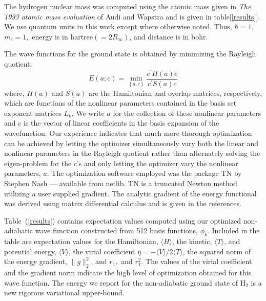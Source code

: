 \documentclass[12pt]{article}
\begin{document}
The hydrogen nuclear mass was computed
using the atomic mass given in \emph{The 1993 atomic mass evaluation} of
Audi and Wapstra\cite{Audi93} and is given in table[\ref{results}].
We use quantum units in this work except where
otherwise noted. Thus, $\hbar =1,$ $m_e=1,$ energy is in hartree$\left(
=2R_\infty \right) $, and distance is in bohr. 

The wave functions for the ground state is obtained by minimizing
the Rayleigh quotient; 
\begin{equation}
E\left( a;c\right) =\min_{\left\{ a,c\right\} }\frac{c^{\prime }H(a)c}{
c^{\prime }S(a)c}  \label{energy}
\end{equation}
where,
$H\left( a\right) $ and $S\left( a\right) $ are the Hamiltonian and overlap
matrices, respectively, 
which are functions of the nonlinear parameters contained in the
basis set exponent matrices $L_k$. We write $a$ for the collection of these
nonlinear parameters and $c$ is the vector of linear coefficients in the basis
expansion of the wavefunction.
Our experience indicates that 
much more thorough optimization can be achieved
by letting the optimizer
simultaneously vary both the linear and nonlinear parameters in the
Rayleigh quotient rather than alternately solving the eigen-problem for
the $c$'s and only letting the optimizer vary the nonlinear parameters, $a$.
The optimization software employed was the package TN by Stephen Nash\cite
{NashTN} --- available from netlib\cite{netlib}. TN is a truncated Newton
method utilizing a user supplied gradient. The analytic gradient of the
energy functional was derived using matrix 
differential calculus\cite{Kinghorn95a,Kinghorn95b} and is given in 
the references\cite{Kinghorn99a}.

Table~(\ref{results})
contains expectation values computed using our 
optimized non-adiabatic wave function constructed from
512 basis functions, $\phi_k$.
Included in
the table are expectation values for the Hamiltonian, 
$\langle H \rangle$, the kinetic, $\langle T \rangle$, and
potential energy, $\langle V \rangle$, the virial coefficient 
$\eta=-\langle V \rangle /2\langle T \rangle$, the squared norm
of the energy gradient, $\|g\|_{2}^{2}$, and
$r_{1},$ and  $r_{1}^{2}$. 
The values of the virial coefficient and the
gradient norm indicate the high level of optimization
obtained for this wave function. The energy we report for the non-adiabatic
ground state of H$_2$ is a new rigorous variational upper-bound. 
\end{document}

